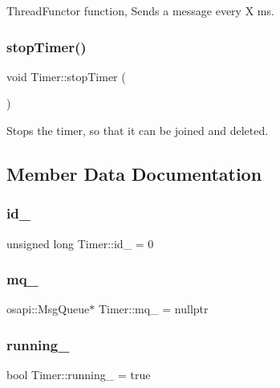 Thread\+Functor function, Sends a message every X ms. 

\mbox{\label{class_timer_a27f97da1b1d19ad74a847703ca25c455}} 
\subsubsection{\texorpdfstring{stop\+Timer()}{stopTimer()}}
{\footnotesize\ttfamily void Timer\+::stop\+Timer (\begin{DoxyParamCaption}{ }\end{DoxyParamCaption})}



Stops the timer, so that it can be joined and deleted. 



\subsection{Member Data Documentation}
\mbox{\label{class_timer_aaf66e97fe49e0657c3c2c1984ac14fe1}} 
\subsubsection{\texorpdfstring{id\+\_\+}{id\_}}
{\footnotesize\ttfamily unsigned long Timer\+::id\+\_\+ = 0\hspace{0.3cm}{\ttfamily [private]}}

\mbox{\label{class_timer_af8eb86ca8b96b4c88c3c0b8c09d88e9a}} 
\subsubsection{\texorpdfstring{mq\+\_\+}{mq\_}}
{\footnotesize\ttfamily osapi\+::\+Msg\+Queue$\ast$ Timer\+::mq\+\_\+ = nullptr\hspace{0.3cm}{\ttfamily [private]}}

\mbox{\label{class_timer_af78e657414c25836212454891b20f0ad}} 
\subsubsection{\texorpdfstring{running\+\_\+}{running\_}}
{\footnotesize\ttfamily bool Timer\+::running\+\_\+ = true\hspace{0.3cm}{\ttfamily [private]}}

